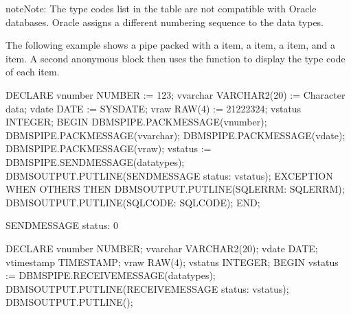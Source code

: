 \documentclass[letterpaper,10pt,english,openany,oneside]{sphinxmanual}
\begin{document}
\begin{sphinxadmonition}{note}{Note:}
The type codes list in the table are not compatible with Oracle databases. Oracle assigns a different numbering sequence to the data types.
\end{sphinxadmonition}


The following example shows a pipe packed with a  item, a 
item, a  item, and a  item. A second anonymous block then uses
the  function to display the type code of each item.

%
\begin{sphinxVerbatim}[commandchars=\\\{\}]
DECLARE
    v\PYGZus{}number        NUMBER := 123;
    v\PYGZus{}varchar       VARCHAR2(20) := \PYGZsq{}Character data\PYGZsq{};
    v\PYGZus{}date          DATE := SYSDATE;
    v\PYGZus{}raw           RAW(4) := \PYGZsq{}21222324\PYGZsq{};
    v\PYGZus{}status        INTEGER;
BEGIN
    DBMS\PYGZus{}PIPE.PACK\PYGZus{}MESSAGE(v\PYGZus{}number);
    DBMS\PYGZus{}PIPE.PACK\PYGZus{}MESSAGE(v\PYGZus{}varchar);
    DBMS\PYGZus{}PIPE.PACK\PYGZus{}MESSAGE(v\PYGZus{}date);
    DBMS\PYGZus{}PIPE.PACK\PYGZus{}MESSAGE(v\PYGZus{}raw);
    v\PYGZus{}status := DBMS\PYGZus{}PIPE.SEND\PYGZus{}MESSAGE(\PYGZsq{}datatypes\PYGZsq{});
    DBMS\PYGZus{}OUTPUT.PUT\PYGZus{}LINE(\PYGZsq{}SEND\PYGZus{}MESSAGE status: \PYGZsq{} \textbar{}\textbar{} v\PYGZus{}status);
EXCEPTION
    WHEN OTHERS THEN
        DBMS\PYGZus{}OUTPUT.PUT\PYGZus{}LINE(\PYGZsq{}SQLERRM: \PYGZsq{} \textbar{}\textbar{} SQLERRM);
        DBMS\PYGZus{}OUTPUT.PUT\PYGZus{}LINE(\PYGZsq{}SQLCODE: \PYGZsq{} \textbar{}\textbar{} SQLCODE);
END;

SEND\PYGZus{}MESSAGE status: 0

DECLARE
    v\PYGZus{}number        NUMBER;
    v\PYGZus{}varchar       VARCHAR2(20);
    v\PYGZus{}date          DATE;
    v\PYGZus{}timestamp     TIMESTAMP;
    v\PYGZus{}raw           RAW(4);
    v\PYGZus{}status        INTEGER;
BEGIN
    v\PYGZus{}status := DBMS\PYGZus{}PIPE.RECEIVE\PYGZus{}MESSAGE(\PYGZsq{}datatypes\PYGZsq{});
    DBMS\PYGZus{}OUTPUT.PUT\PYGZus{}LINE(\PYGZsq{}RECEIVE\PYGZus{}MESSAGE status: \PYGZsq{} \textbar{}\textbar{} v\PYGZus{}status);
    DBMS\PYGZus{}OUTPUT.PUT\PYGZus{}LINE(\PYGZsq{}\PYGZhy{}\PYGZhy{}\PYGZhy{}\PYGZhy{}\PYGZhy{}\PYGZhy{}\PYGZhy{}\PYGZhy{}\PYGZhy{}\PYGZhy{}\PYGZhy{}\PYGZhy{}\PYGZhy{}\PYGZhy{}\PYGZhy{}\PYGZhy{}\PYGZhy{}\PYGZhy{}\PYGZhy{}\PYGZhy{}\PYGZhy{}\PYGZhy{}\PYGZhy{}\PYGZhy{}\PYGZhy{}\PYGZhy{}\PYGZhy{}\PYGZhy{}\PYGZhy{}\PYGZhy{}\PYGZhy{}\PYGZhy{}\PYGZhy{}\PYGZhy{}\PYGZsq{});


\end{sphinxVerbatim}
\end{document}
